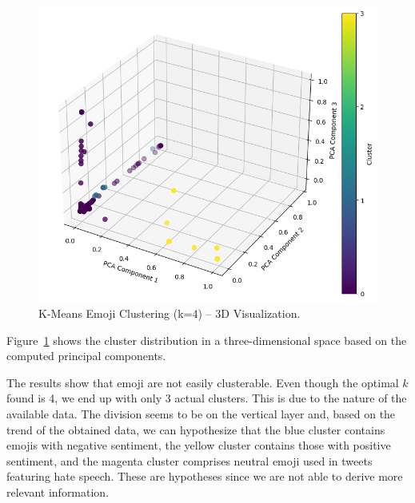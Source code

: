 \begin{figure}
    \includegraphics[width=\columnwidth]{../../results/images/emoji_cluster.png}
    \caption{K-Means Emoji Clustering (k=4) – 3D Visualization.}
    \label{fig:3d_clustering}
\end{figure}

Figure~\ref{fig:3d_clustering} shows the cluster distribution in a three-dimensional space based on the computed principal components.

The results show that emoji are not easily clusterable. Even though the optimal \( k \) found is 4, we end up with only 3 actual clusters. This is due to the nature of the available data. The division seems to be on the vertical layer and, based on the trend of the obtained data, we can hypothesize that the blue cluster contains emojis with negative sentiment, the yellow cluster contains those with positive sentiment, and the magenta cluster comprises neutral emoji used in tweets featuring hate speech. These are hypotheses since we are not able to derive more relevant information.
